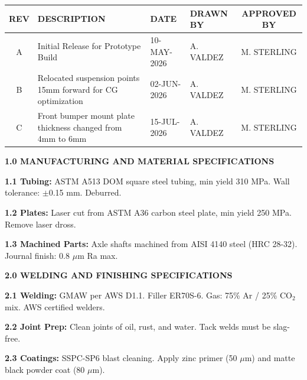 \documentclass[10pt]{article}
\begin{document}
\vspace{1.5mm}
\renewcommand{\arraystretch}{1.0}
\begin{tabularx}{\textwidth}{c X l l c}
  \toprule
  \rowcolor{CADBlue!5}
  \textbf{REV} & \textbf{DESCRIPTION} & \textbf{DATE} & \textbf{DRAWN BY} & \textbf{APPROVED BY} \\
  \midrule
  A & Initial Release for Prototype Build & 10-MAY-2026 & A. VALDEZ & M. STERLING \\
  B & Relocated suspension points 15mm forward for CG optimization & 02-JUN-2026 & A. VALDEZ & M. STERLING \\
  C & Front bumper mount plate thickness changed from 4mm to 6mm & 15-JUL-2026 & A. VALDEZ & M. STERLING \\
  \bottomrule
\end{tabularx}

\par\vspace{0.5mm}

\noindent
\begin{minipage}[t]{11.5cm}
  {\fontsize{9}{11}\selectfont\sffamily\bfseries\color{CADBlue} 1.0 MANUFACTURING AND MATERIAL SPECIFICATIONS}
  
  \vspace{1.0mm}
  {\fontsize{7.0}{8.5}\selectfont\sffamily
  \textbf{1.1 Tubing:} ASTM A513 DOM square steel tubing, min yield 310 MPa. Wall tolerance: $\pm$0.15 mm. Deburred.
  
  \vspace{1.0mm}
  \textbf{1.2 Plates:} Laser cut from ASTM A36 carbon steel plate, min yield 250 MPa. Remove laser dross.
  
  \vspace{1.0mm}
  \textbf{1.3 Machined Parts:} Axle shafts machined from AISI 4140 steel (HRC 28-32). Journal finish: 0.8 $\mu$m Ra max.
  }
\end{minipage}%
\hfill
\begin{minipage}[t]{11.5cm}
  {\fontsize{9}{11}\selectfont\sffamily\bfseries\color{CADBlue} 2.0 WELDING AND FINISHING SPECIFICATIONS}
  
  \vspace{1.0mm}
  {\fontsize{7.0}{8.5}\selectfont\sffamily
  \textbf{2.1 Welding:} GMAW per AWS D1.1. Filler ER70S-6. Gas: 75\% Ar / 25\% CO$_2$ mix. AWS certified welders.
  
  \vspace{1.0mm}
  \textbf{2.2 Joint Prep:} Clean joints of oil, rust, and water. Tack welds must be slag-free.
  
  \vspace{1.0mm}
  \textbf{2.3 Coatings:} SSPC-SP6 blast cleaning. Apply zinc primer (50 $\mu$m) and matte black powder coat (80 $\mu$m).
  }
\end{minipage}
\end{document}
